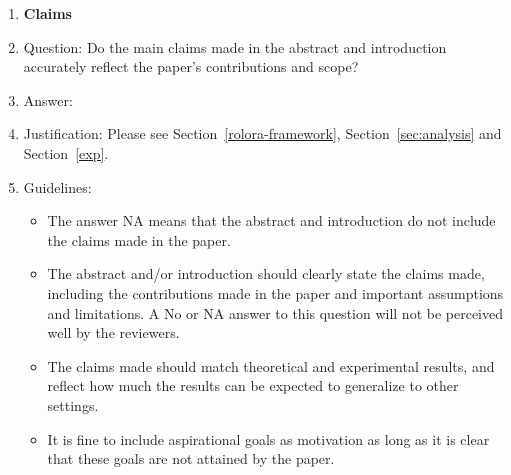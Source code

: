 \documentclass{article}
\theoremstyle{plain}
\theoremstyle{definition}
\theoremstyle{remark}
\begin{document}


\begin{enumerate}

\item {\bf Claims}
    \item[] Question: Do the main claims made in the abstract and introduction accurately reflect the paper's contributions and scope?
    \item[] Answer: \answerYes{}%
    \item[] Justification: Please see Section~\ref{rolora-framework}, Section~\ref{sec:analysis} and Section~\ref{exp}.
    \item[] Guidelines:
    \begin{itemize}
        \item The answer NA means that the abstract and introduction do not include the claims made in the paper.
        \item The abstract and/or introduction should clearly state the claims made, including the contributions made in the paper and important assumptions and limitations. A No or NA answer to this question will not be perceived well by the reviewers. 
        \item The claims made should match theoretical and experimental results, and reflect how much the results can be expected to generalize to other settings. 
        \item It is fine to include aspirational goals as motivation as long as it is clear that these goals are not attained by the paper. 
    \end{itemize}


\end{enumerate}
\end{document}
